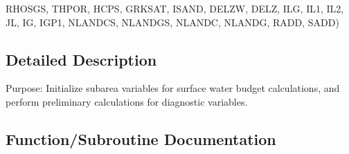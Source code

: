 \begin{DoxyCompactItemize}
R\+H\+O\+S\+G\+S, T\+H\+P\+O\+R, H\+C\+P\+S, G\+R\+K\+S\+A\+T, I\+S\+A\+N\+D, D\+E\+L\+Z\+W, D\+E\+L\+Z, I\+L\+G, I\+L1, I\+L2, J\+L, I\+G, I\+G\+P1, N\+L\+A\+N\+D\+C\+S, N\+L\+A\+N\+D\+G\+S, N\+L\+A\+N\+D\+C, N\+L\+A\+N\+D\+G, R\+A\+D\+D, S\+A\+D\+D)
\end{DoxyCompactItemize}


\subsection{Detailed Description}
Purpose\+: Initialize subarea variables for surface water budget calculations, and perform preliminary calculations for diagnostic variables. 



\subsection{Function/\+Subroutine Documentation}
\hypertarget{WPREP_8f_a8bd6e495bd4674e569184609d67fa736}{}
